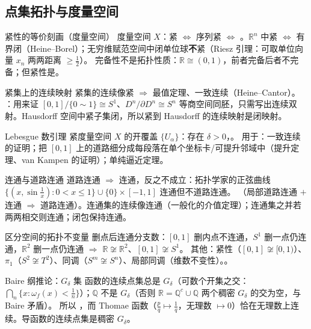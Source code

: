 \subsection{点集拓扑与度量空间}

\begin{结论}{紧性的等价刻画（度量空间）}
度量空间 $X$：紧 $\iff$ 序列紧 $\iff$ 。$\mathbb R^n$ 中紧 $\iff$ 有界闭（Heine--Borel）；无穷维赋范空间中闭单位球\textbf{不}紧（Riesz 引理：可取单位向量 $x_n$ 两两距离 $\ge\frac12$）。
完备性不是拓扑性质：$\mathbb R\cong(0,1)$，前者完备后者不完备；但紧性是。
\end{结论}

\begin{结论}{紧集上的连续映射}
紧集的连续像紧 $\Rightarrow$ 最值定理、一致连续（Heine--Cantor）。
：用来证 $[0,1]/\{0\sim1\}\cong S^1$、$D^n/\partial D^n\cong S^n$ 等商空间同胚，只需写出连续双射。Hausdorff 空间中紧子集闭，所以紧到 Hausdorff 的连续映射是闭映射。
\end{结论}

\begin{结论}{Lebesgue 数引理}
紧度量空间 $X$ 的开覆盖 $\{U_\alpha\}$：存在 $\delta>0$，。
用于：一致连续的证明；把 $[0,1]$ 上的道路细分成每段落在单个坐标卡/可提升邻域中（提升定理、van Kampen 的证明）；单纯逼近定理。
\end{结论}

\begin{结论}{连通与道路连通}
道路连通 $\Rightarrow$ 连通，反之不成立：拓扑学家的正弦曲线 $\{(x,\sin\frac1x):0<x\le1\}\cup\{0\}\times[-1,1]$ 连通但不道路连通。
（局部道路连通 $+$ 连通 $\Rightarrow$ 道路连通）。连通集的连续像连通（一般化的介值定理）；连通集之并若两两相交则连通；闭包保持连通。
\end{结论}

\begin{结论}{区分空间的拓扑不变量}
删点后连通分支数：$[0,1]$ 删内点不连通，$S^1$ 删一点仍连通，$\mathbb R^2$ 删一点仍连通 $\Rightarrow$ $\mathbb R\not\cong\mathbb R^2$、$[0,1]\not\cong S^1$。
其他：紧性（$[0,1]\not\cong[0,1)$）、$\pi_1$（$S^2\not\cong T^2$）、同调（$S^m\not\cong S^n$）、局部同调（维数不变性）。。
\end{结论}

\begin{结论}{Baire 纲推论：$G_\delta$ 集}
函数的连续点集总是 $G_\delta$（可数个开集之交：$\bigcap_n\{x:\omega_f(x)<\frac1n\}$）；$\mathbb Q$ 不是 $G_\delta$（否则 $\mathbb R=\mathbb Q^c\cup\mathbb Q$ 两个稠密 $G_\delta$ 的交为空，与 Baire 矛盾）。
所以 ，而 Thomae 函数（$\frac pq\mapsto\frac1q$，无理数 $\mapsto0$）恰在无理数上连续。导函数的连续点集是稠密 $G_\delta$。
\end{结论}

